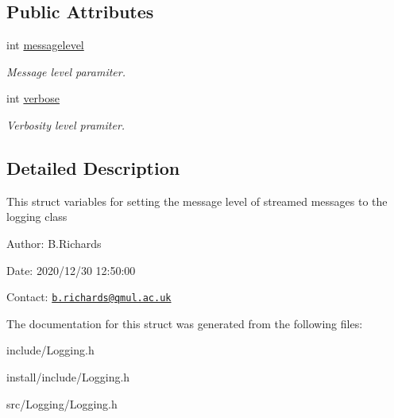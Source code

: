 \subsection*{Public Attributes}
\begin{DoxyCompactItemize}
\item 
\hypertarget{structMsgL_a5372c9de7067078f88eda46bcec43096}{int \hyperlink{structMsgL_a5372c9de7067078f88eda46bcec43096}{messagelevel}}\label{structMsgL_a5372c9de7067078f88eda46bcec43096}

\begin{DoxyCompactList}\small\item\em Message level paramiter. \end{DoxyCompactList}\item 
\hypertarget{structMsgL_a10337c60eff6573f6bf36dd6b6bfd4c6}{int \hyperlink{structMsgL_a10337c60eff6573f6bf36dd6b6bfd4c6}{verbose}}\label{structMsgL_a10337c60eff6573f6bf36dd6b6bfd4c6}

\begin{DoxyCompactList}\small\item\em Verbosity level pramiter. \end{DoxyCompactList}\end{DoxyCompactItemize}


\subsection{Detailed Description}
This struct variables for setting the message level of streamed messages to the logging class

\begin{DoxyParagraph}{Author\-:}
B.\-Richards 
\end{DoxyParagraph}
\begin{DoxyParagraph}{Date\-:}
2020/12/30 12\-:50\-:00 
\end{DoxyParagraph}
Contact\-: \href{mailto:b.richards@qmul.ac.uk}{\tt b.\-richards@qmul.\-ac.\-uk} 

The documentation for this struct was generated from the following files\-:\begin{DoxyCompactItemize}
\item 
include/Logging.\-h\item 
install/include/Logging.\-h\item 
src/\-Logging/Logging.\-h\end{DoxyCompactItemize}
